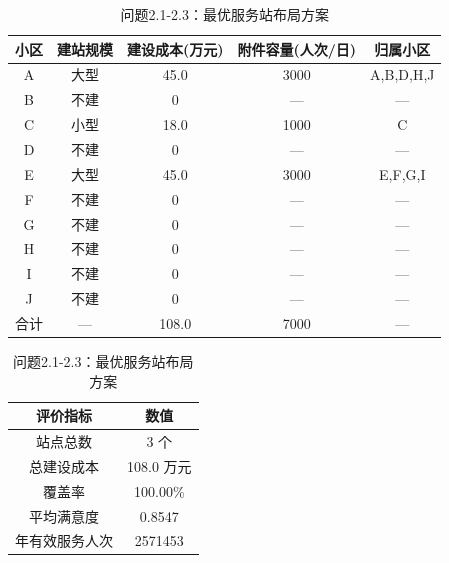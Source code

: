 \begin{table}[htbp]
\centering
\caption{问题2.1-2.3：最优服务站布局方案}
\begin{tabular}{|c|c|c|c|c|}
\hline
小区 & 建站规模 & 建设成本(万元) & 附件容量(人次/日) & 归属小区 \\
\hline
A & 大型 & 45.0 & 3000 & A,B,D,H,J \\
B & 不建 & 0 & — & — \\
C & 小型 & 18.0 & 1000 & C \\
D & 不建 & 0 & — & — \\
E & 大型 & 45.0 & 3000 & E,F,G,I \\
F & 不建 & 0 & — & — \\
G & 不建 & 0 & — & — \\
H & 不建 & 0 & — & — \\
I & 不建 & 0 & — & — \\
J & 不建 & 0 & — & — \\
\hline
合计 & — & 108.0 & 7000 & — \\
\hline
\end{tabular}

\vspace{0.2cm}
\begin{tabular}{|c|c|}
\hline
评价指标 & 数值 \\
\hline
站点总数 & 3 个 \\
总建设成本 & 108.0 万元 \\
覆盖率 & 100.00\% \\
平均满意度 & 0.8547 \\
年有效服务人次 & 2571453 \\
\hline
\end{tabular}
\end{table}
